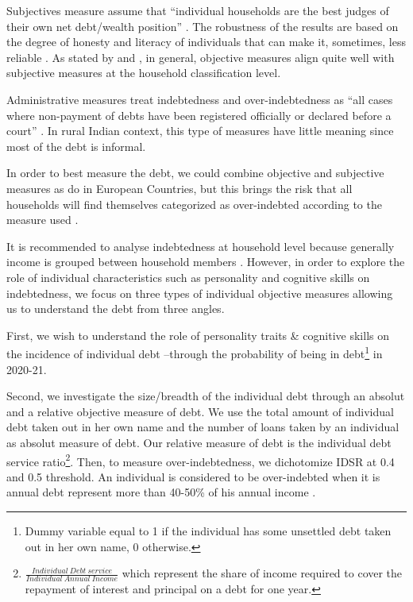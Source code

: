 \documentclass[a4paper, 11pt, onecolumn]{article}
\begin{document}
Subjectives measure assume that ``individual households are the best judges of their own net debt/wealth position'' \citep{Betti2007}.
The robustness of the results are based on the degree of honesty and literacy of individuals that can make it, sometimes, less reliable \citep{Betti2007, DAlessio2013}.
As stated by \cite{Rinaldi2006} and \cite{Keese2012}, in general, objective measures align quite well with subjective measures at the household classification level.

Administrative measures treat indebtedness and over-indebtedness as ``all cases
where non-payment of debts have been registered officially or declared before a court'' \citep{Betti2007}.
In rural Indian context, this type of measures have little meaning since most of the debt is informal.

In order to best measure the debt, we could combine objective and subjective measures as \cite{Aniola2012} do in European Countries, but this brings the risk that all households will find themselves categorized as over-indebted according to the measure used \citep{Chichaibelu2018}.

It is recommended to analyse indebtedness at household level because generally income is grouped between household members \citep{European2010}.
However, in order to explore the role of individual characteristics such as personality and cognitive skills on indebtedness, we focus on three types of individual objective measures allowing us to understand the debt from three angles.

First, we wish to understand the role of personality traits \& cognitive skills on the incidence of individual debt --through the probability of being in debt\footnote{Dummy variable equal to 1 if the individual has some unsettled debt taken out in her own name, 0 otherwise.} in 2020-21.

Second, we investigate the size/breadth of the individual debt through an absolut and a relative objective measure of debt. 
We use the total amount of individual debt taken out in her own name and the number of loans taken by an individual as absolut measure of debt.
Our relative measure of debt is the individual debt service ratio\footnote{$\frac{Individual~Debt~service}{Individual~Annual~Income}$ which represent the share of income required to cover the repayment of interest and principal on a debt for one year.}.
Then, to measure over-indebtedness, we dichotomize IDSR at 0.4 and 0.5 threshold.
An individual is considered to be over-indebted when it is annual debt represent more than 40-50\% of his annual income \citep{Chichaibelu2017, DAlessio2013}.
\end{document}

